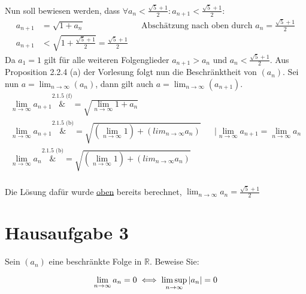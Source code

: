 \documentclass{article}
\begin{document}
Nun soll bewiesen werden, dass $\forall a_n < \frac{\sqrt{5} + 1}{2} \colon a_{n+1} < \frac{\sqrt{5} + 1}{2}$:
\begin{align*}
  a_{n+1} &= \sqrt{1 + a_n} && \text{Abschätzung nach oben durch $a_n = \frac{\sqrt{5} + 1}{2}$} \\
  a_{n+1} &< \sqrt{1 + \frac{\sqrt{5} + 1}{2}} =  \frac{\sqrt{5} + 1}{2}
\end{align*}
Da $a_1 = 1$ gilt für alle weiteren Folgenglieder $a_{n+1} > a_n$ und $a_n < \frac{\sqrt{5} + 1}{2}$.
Aus Proposition 2.2.4 (a) der Vorlesung folgt nun die Beschränktheit von $(a_n)$.
Sei nun $a = \lim_{n \to \infty} (a_n)$, dann gilt auch $a = \lim_{n \to \infty} (a_{n+1})$.
\begin{align*}
  \lim_{n\to\infty} a_{n+1} \overset{\text{2.1.5 (f)}}&= \sqrt{\lim_{n\to\infty}1+a_n} \\
  \lim_{n\to\infty} a_{n+1} \overset{\text{2.1.5 (b)}}&= \sqrt{(\lim_{n\to\infty}1)+(lim_{n\to\infty}a_n)}
                                                      && | \underset{n\to\infty}\lim a_{n+1} = \underset{n\to\infty}\lim a_n  \\
  \lim_{n\to\infty} a_n \overset{\text{2.1.5 (b)}}&= \sqrt{(\lim_{n\to\infty}1)+(lim_{n\to\infty}a_n)} \\
\end{align*}

Die Lösung dafür wurde \hyperref[defn:liman]{oben} bereits berechnet, $\lim_{n\to\infty} a_n = \frac{\sqrt{5} + 1}{2}$

\newpage
\section*{Hausaufgabe 3}

Sein $(a_n)$ eine beschränkte Folge in $\mathbb{R}$. Beweise Sie:

\[
  \lim_{n \to \infty} a_n = 0 \iff \limsup_{n \to \infty} \abs{a_n} = 0
\]
\end{document}
